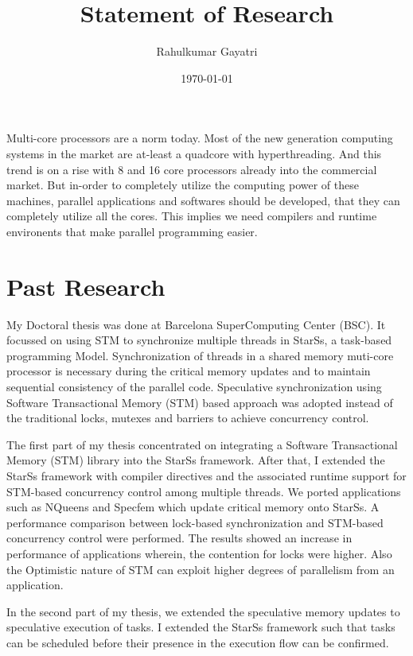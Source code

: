 \documentclass{article}
\title{Statement of Research}
\author{Rahulkumar Gayatri}
\date{\today}
\begin{document}
\maketitle%
\mbox{}\newline
Multi-core processors are a norm today. Most of the new generation computing systems in the market are at-least a quadcore with hyperthreading. 
And this trend is on a rise with 8 and 16 core processors already into the commercial market.
But in-order to completely utilize the computing power of these machines, parallel applications and softwares should be developed, that they can completely utilize all the cores.
This implies we need compilers and runtime environents that make parallel programming easier. 

%
\section{Past Research}
%
\par
My Doctoral thesis was done at Barcelona SuperComputing Center (BSC).
It focussed on using STM to synchronize multiple threads in StarSs, a task-based programming Model.
Synchronization of threads in a shared memory muti-core processor is necessary during the critical memory updates and to maintain sequential consistency of the parallel code.
Speculative synchronization using Software Transactional Memory (STM) based approach was adopted instead of the traditional locks, mutexes and barriers to achieve concurrency control. 
%
\par
The first part of my thesis concentrated on integrating a Software Transactional Memory (STM) library into the StarSs framework.
After that, I extended the StarSs framework with compiler directives and the associated runtime support for STM-based concurrency control among multiple threads.
We ported applications such as NQueens and Specfem which update critical memory onto StarSs.
A performance comparison between lock-based synchronization and STM-based concurrency control were performed.
The results showed an increase in performance of applications wherein, the contention for locks were higher.
Also the Optimistic nature of STM can exploit higher degrees of parallelism from an application. 
%
\par
In the second part of my thesis, we extended the speculative memory updates to speculative execution of tasks.
I extended the StarSs framework such that tasks can be scheduled before their presence in the execution flow can be confirmed.
\end{document}
